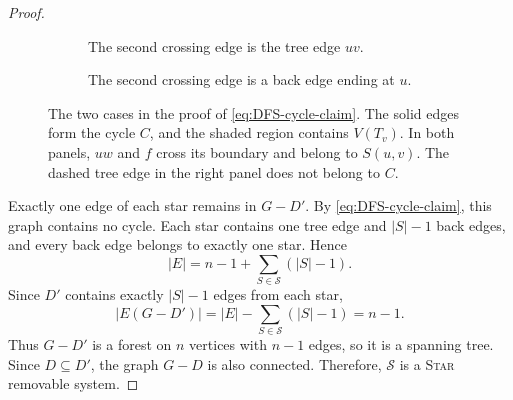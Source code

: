 \documentclass[11pt]{amsart}
\newcommand{\1}{\mathbbm{1}}
\begin{document}
\begin{proof}
\begin{figure}[H]
\centering
\begin{subfigure}[t]{.46\textwidth}
\centering
{}
\caption{The second crossing edge is the tree edge $uv$.}
\end{subfigure}\hfill
\begin{subfigure}[t]{.46\textwidth}
\centering
{}
\caption{The second crossing edge is a back edge ending at $u$.}
\end{subfigure}
\caption{The two cases in the proof of \eqref{eq:DFS-cycle-claim}.
The solid edges form the cycle $C$, and the shaded region contains
$V(T_v)$. In both panels, $uw$ and $f$ cross its boundary and
belong to $S(u,v)$. The dashed tree edge in the right panel
does not belong to $C$.}
\label{fig:DFS-cycle-claim}
\end{figure}

Exactly one edge of each star remains in $G-D'$. By
\eqref{eq:DFS-cycle-claim}, this graph contains no cycle.
Each star contains one tree edge and $|S|-1$ back edges,
and every back edge belongs to exactly one star. Hence
\[
    |E|=n-1+\sum_{S\in\mathcal S}(|S|-1).
\]
Since $D'$ contains exactly $|S|-1$ edges from each star,
\[
    |E(G-D')|
    =|E|-\sum_{S\in\mathcal S}(|S|-1)
    =n-1.
\]
Thus $G-D'$ is a forest on $n$ vertices with $n-1$ edges,
so it is a spanning tree. Since $D\subseteq D'$, the graph
$G-D$ is also connected. Therefore, $\mathcal S$ is a
\textsc{Star} removable system.
\end{proof}
\end{document}

